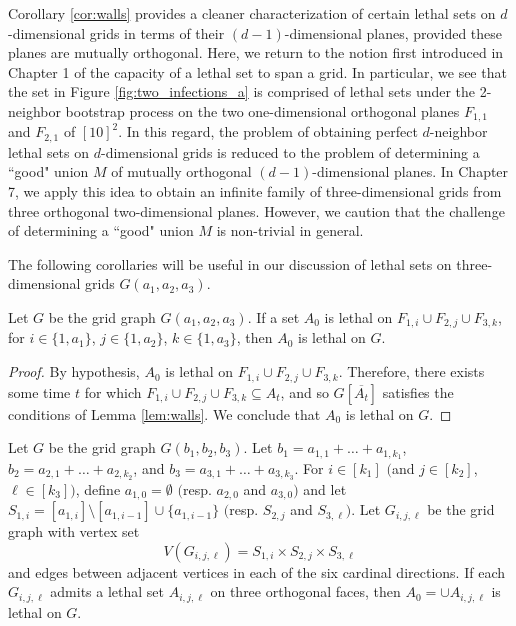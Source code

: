 Corollary \ref{cor:walls} provides a cleaner characterization of certain lethal sets on $d$-dimensional grids in terms of their $(d-1)$-dimensional planes, provided these planes are mutually orthogonal. Here, we return to the notion first introduced in Chapter 1 of the capacity of a lethal set to span a grid. In particular, we see that the set in Figure \ref{fig:two_infections_a} is comprised of lethal sets under the 2-neighbor bootstrap process on the two one-dimensional orthogonal planes $F_{1,1}$ and $F_{2,1}$ of $[10]^2$. In this regard, the problem of obtaining perfect $d$-neighbor lethal sets on $d$-dimensional grids is reduced to the problem of determining a ``good" union $M$ of mutually orthogonal $(d-1)$-dimensional planes. 
In Chapter 7, we apply this idea to obtain an infinite family of three-dimensional grids from three orthogonal two-dimensional planes. However, we caution that the challenge of determining a ``good" union $M$ is non-trivial in general.

The following corollaries will be useful in our discussion of lethal sets on three-dimensional grids $G(a_1,a_2,a_3)$. 

\begin{cor}
\label{cor:three_walls_simple}
Let $G$ be the grid graph $G(a_1,a_2,a_3)$. If a set $A_0$ is lethal on $F_{1,i} \cup F_{2,j} \cup F_{3,k}$, for $i \in \{1,a_1\}$, $j \in \{1,a_2\}$, $k \in \{1,a_3\}$, then $A_0$ is lethal on $G$.
\end{cor}

\begin{proof}
By hypothesis, $A_0$ is lethal on $F_{1,i} \cup F_{2,j} \cup F_{3,k}$. Therefore, there exists some time $t$ for which $F_{1,i} \cup F_{2,j} \cup F_{3,k} \subseteq A_t$, and so $G[\overline{A_t}]$ satisfies the conditions of Lemma \ref{lem:walls}. We conclude that $A_0$ is lethal on $G$.
\end{proof}

\begin{cor}
\label{cor:three_walls}
Let $G$ be the grid graph $G(b_1,b_2,b_3)$. Let $b_1 = a_{1,1} + \dots + a_{1,k_1}$, $b_2 = a_{2,1} + \dots + a_{2,k_2}$, and $b_3 = a_{3,1} + \dots + a_{3,k_3}$. For $i \in [k_1]$ $($and $j \in [k_2]$, $\ell \in [k_3]$$)$, define $a_{1,0} = \emptyset$ $($resp. $a_{2,0}$ and $a_{3,0}$$)$ and let $S_{1,i} = [a_{1,i}] \setminus [a_{1,i-1}] \cup \{a_{1,i-1}\}$ $($resp. $S_{2,j}$ and $S_{3,\ell}$$)$. Let $G_{i,j,\ell}$ be the grid graph with vertex set
$$V(G_{i,j,\ell}) = S_{1,i} \times S_{2,j} \times S_{3,\ell}$$
and edges between adjacent vertices in each of the six cardinal directions. If each $G_{i,j,\ell}$ admits a lethal set $A_{i,j,\ell}$ on three orthogonal faces, then $A_0 = \cup A_{i,j,\ell}$ is lethal on $G$.
\end{cor}

